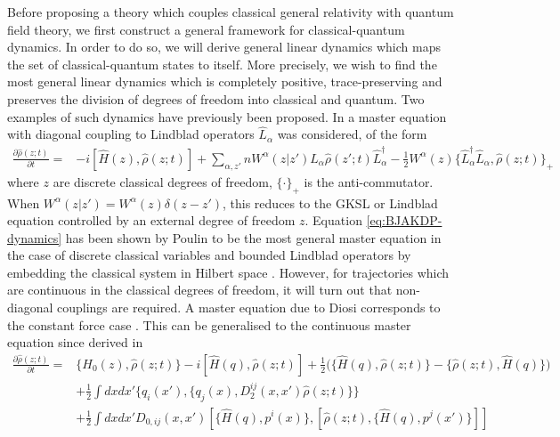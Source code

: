 \documentclass[aps,pra,showpacs,citeautoscript,amsmath,amssymb,floatfix,superscriptaddress,bbm, verbatim,amsfonts,changes,11pt,nofootinbib,longbibliography]{revtex4-2}
\def\z{{z}}
\def\L{{\hat{L}}}
\def\Hq{\hat{H}}
\def\rate{{W}}
\renewcommand{\varrho}{\hat{\rho}}
\def\psiz{{\varrho(\z;t)}}
\def\psizp{{\varrho(\z';t)}}
\def\PB{\}}
\begin{document}
Before proposing a theory which couples classical general relativity with quantum field theory, we first construct a
general framework for classical-quantum dynamics.
 In order to do so, we will derive general linear dynamics which maps the set of classical-quantum states to itself. More precisely, we wish to find the most general linear dynamics which is completely positive, trace-preserving and preserves the division of degrees of freedom into classical and quantum. Two examples of such dynamics have previously been proposed. In  \cite{blanchard1993interaction,blanchard1995event} a master equation with diagonal coupling to Lindblad operators $\L_\alpha$  was considered, of the form
\begin{align}
  \frac{\partial\psiz}{\partial t}
  =&-i[\Hq(\z),\psiz]+
  \sum_{\alpha,\z'}  n
 \rate^{\alpha}(\z|\z')
  \L_{\alpha}\psizp\L_{\alpha}^\dagger  
-\frac{1}{2}\rate^\alpha(\z)\{\L_\alpha^\dagger\L_\alpha,\psiz\}_+
      \label{eq:BJAKDP-dynamics}
\end{align} where $\z$ are discrete classical degrees of freedom,
 $\{\cdot\}_+$ is the anti-commutator. 
When $\rate^\alpha(\z|\z')=W^\alpha(\z)\delta(\z-\z')$, this reduces to
the GKSL or Lindblad equation \cite{GKS76,Lindblad76} controlled by an external degree of freedom $\z$.  Equation \eqref{eq:BJAKDP-dynamics} has been shown by Poulin to be the most general master equation in the case of discrete classical variables and bounded Lindblad operators by embedding the classical system in Hilbert space \cite{poulinPC}. However, for trajectories which are continuous in the classical degrees of freedom, it will turn out that non-diagonal couplings are required. A master equation due to Diosi corresponds to the constant force case \cite{diosi1995quantum}. 
This can be generalised to the continuous master equation since derived in  \cite{UCLPawula}
\begin{align}
\frac{\partial\psiz}{\partial t}
=&\{H_0(\z),\psiz\}-i[\Hq(q),\psiz]
+
\frac{1}{2}\Big(\{\Hq(q),\psiz\PB-\{\psiz,\Hq(q)\PB\Big)
 \nonumber\\ 
&+\frac{1}{2}\int dxdx' \{q_i(x'),\{q_j(x),D_2^{ij}(x,x')\psiz\}\}
 \nonumber\\ 
&+\frac{1}{2}\int dxdx'D_{0,ij}(x,x')
\left[\{\Hq(q),p^i(x)\},\left[\psiz,\{\Hq(q),p^j(x')\}\right]\right]
\label{eq:CQcontinuousHam}
\end{align}
\end{document}
